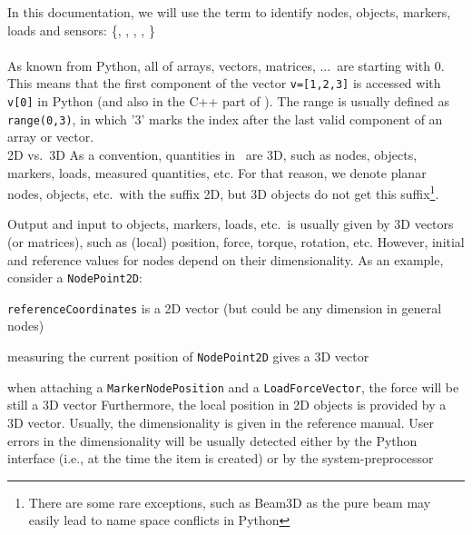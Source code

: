 In this documentation, we will use the term  to identify nodes, objects, markers, loads and sensors:
\be
   \in \{, , , ,  \}
\ee
\vspace{12pt}\\
 \vspace{6pt}\\
As known from Python, all  of arrays, vectors, matrices, ...\ are starting with 0. This means that the first component of the vector \texttt{v=[1,2,3]} is accessed with \texttt{v[0]} in Python (and also in the C++ part of \codeName ). The range is usually defined as \texttt{range(0,3)}, in which '3' marks the index after the last valid component of an array or vector.
\ignoreRST{\vspace{12pt}\\}
%
 \ignoreRST{\vspace{6pt}}\\ 
\ac{2D} vs.\ \ac{3D}
\ignoreRST{\vspace{6pt}\\}
As a convention, quantities in \codeName\ are 3D, such as nodes, objects, markers, loads, measured quantities, etc. 
For that reason, we denote planar nodes, objects, etc.\ with the suffix 2D, but 3D objects do not get this suffix\footnote{There are some rare exceptions, such as Beam3D as the pure beam may easily lead to name space conflicts in Python}.

Output and input to objects, markers, loads, etc.\ is usually given by 3D vectors (or matrices), such as (local) position, force, torque, rotation, etc. However, initial and reference values for nodes depend on their dimensionality.
As an example, consider a \texttt{NodePoint2D}:
\bi
  \item \texttt{referenceCoordinates} is a 2D vector (but could be any dimension in general nodes)
  \item measuring the current position of \texttt{NodePoint2D} gives a 3D vector
  \item when attaching a \texttt{MarkerNodePosition} and a \texttt{LoadForceVector}, the force will be still a 3D vector
\ei
Furthermore, the local position in 2D objects is provided by a 3D vector. Usually, the dimensionality is given in the reference manual. User errors in the dimensionality will be usually detected either by the Python interface (i.e., at the time the item is created) or by the system-preprocessor

